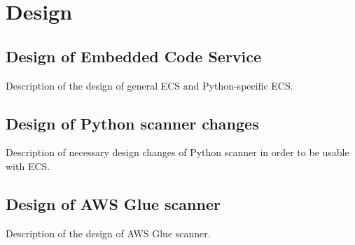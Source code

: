 \chapter{Design}

\section{Design of Embedded Code Service}
Description of the design of general ECS and Python-specific ECS.

\section{Design of Python scanner changes}
Description of necessary design changes of Python scanner in order to be usable with ECS.

\section{Design of AWS Glue scanner}
Description of the design of AWS Glue scanner.